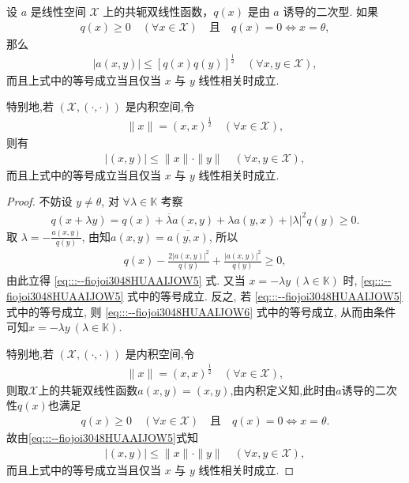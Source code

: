 \documentclass[../../main.tex]{subfiles}%
\begin{document}
\begin{theorem}\label{theorem:泛函分析--Cauchy-Schwarz不等式}
设 $a$ 是线性空间 $\mathscr{X}$ 上的共轭双线性函数，$q(x)$ 是由 $a$ 诱导的二次型. 如果
\begin{align*}
q(x)\geqslant 0\quad(\forall x\in\mathscr{X})\quad\text{且}\quad q(x)=0\iff x=\theta,
\end{align*}
那么
\begin{align}
|a(x,y)|\leqslant [q(x)q(y)]^\frac{1}{2}\quad(\forall x,y\in\mathscr{X}),\label{eq:::--fiojoi3048HUAAIJOW5}
\end{align}
而且上式中的等号成立当且仅当 $x$ 与 $y$ 线性相关时成立.

特别地,若 $(\mathscr{X},(\cdot,\cdot))$ 是内积空间,令
\begin{align*}
\|x\|=(x,x)^\frac{1}{2}\quad(\forall x\in\mathscr{X}),
\end{align*}
则有
\begin{align*}
|(x,y)|\leqslant\|x\|\cdot\|y\|\quad(\forall x,y\in\mathscr{X}),
\end{align*}
而且上式中的等号成立当且仅当 $x$ 与 $y$ 线性相关时成立.
\end{theorem}
\begin{proof}
不妨设 $y\neq\theta$, 对 $\forall\lambda\in\mathbb{K}$ 考察
\begin{align}
q(x+\lambda y)=q(x)+\overline{\lambda}a(x,y)+\lambda a(y,x)+|\lambda|^2q(y)\geqslant 0.\label{eq:::--fiojoi3048HUAAIJOW6}
\end{align}
取 $\lambda=-\frac{a(x,y)}{q(y)}$, 由知$a(x,y)=\overline{a(y,x)}$, 所以
\begin{align*}
q(x)-\frac{2|a(x,y)|^2}{q(y)}+\frac{|a(x,y)|^2}{q(y)}\geqslant 0,
\end{align*}
由此立得 \eqref{eq:::--fiojoi3048HUAAIJOW5} 式. 又当 $x=-\lambda y\ (\lambda\in\mathbb{K})$ 时, \eqref{eq:::--fiojoi3048HUAAIJOW5} 式中的等号成立. 反之, 若 \eqref{eq:::--fiojoi3048HUAAIJOW5} 式中的等号成立, 则 \eqref{eq:::--fiojoi3048HUAAIJOW6} 式中的等号成立, 从而由条件可知$x=-\lambda y\ (\lambda\in\mathbb{K})$.

特别地,若 $(\mathscr{X},(\cdot,\cdot))$ 是内积空间,令
\begin{align*}
\|x\|=(x,x)^\frac{1}{2}\quad(\forall x\in\mathscr{X}),
\end{align*}
则取$\mathscr{X}$上的共轭双线性函数$a(x,y)=(x,y)$,由内积定义知,此时由$a$诱导的二次性$q(x)$也满足
\begin{align*}
q(x)\geqslant 0\quad(\forall x\in\mathscr{X})\quad\text{且}\quad q(x)=0\iff x=\theta.
\end{align*}
故由\eqref{eq:::--fiojoi3048HUAAIJOW5}式知
\begin{align*}
|(x,y)|\leqslant\|x\|\cdot\|y\|\quad(\forall x,y\in\mathscr{X}),
\end{align*}
而且上式中的等号成立当且仅当 $x$ 与 $y$ 线性相关时成立.
\end{proof}
\end{document}
